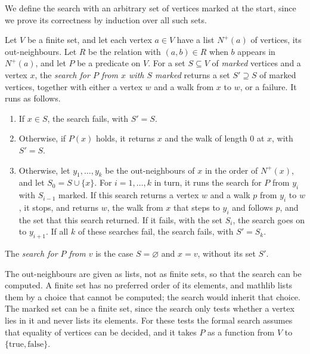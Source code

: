 We define the search with an arbitrary set of vertices marked at the
start, since we prove its correctness by induction over all such sets.

\begin{definition}
  \label{def:reachable-finding}
  \leanok
  Let $V$ be a finite set, and let each vertex $a \in V$ have a list
  $N^+(a)$ of vertices, its out-neighbours. Let $R$ be the relation
  with $(a, b) \in R$ when $b$ appears in $N^+(a)$, and let $P$ be a
  predicate on $V$. For a set $S \subseteq V$ of \emph{marked}
  vertices and a vertex $x$, the \emph{search for $P$ from $x$ with
  $S$ marked} returns a set $S' \supseteq S$ of marked vertices,
  together with either a vertex $w$ and a walk from $x$ to $w$, or a
  failure. It runs as follows.
  \begin{enumerate}
    \item If $x \in S$, the search fails, with $S' = S$.
    \item Otherwise, if $P(x)$ holds, it returns $x$ and the walk of
      length $0$ at $x$, with $S' = S$.
    \item Otherwise, let $y_1, \ldots, y_k$ be the out-neighbours of
      $x$ in the order of $N^+(x)$, and let $S_0 = S \cup \{x\}$. For
      $i = 1, \ldots, k$ in turn, it runs the search for $P$ from
      $y_i$ with $S_{i-1}$ marked. If this search returns a vertex $w$
      and a walk $p$ from $y_i$ to $w$, it stops, and returns $w$, the
      walk from $x$ that steps to $y_i$ and follows $p$, and the set
      that this search returned. If it fails, with the set $S_i$, the
      search goes on to $y_{i+1}$. If all $k$ of these searches fail,
      the search fails, with $S' = S_k$.
  \end{enumerate}
  The \emph{search for $P$ from $v$} is the case $S = \varnothing$ and
  $x = v$, without its set $S'$.
\end{definition}

\begin{fmlnote}
  The out-neighbours are given as lists, not as finite sets, so that
  the search can be computed. A finite set has no preferred order of
  its elements, and mathlib lists them by a choice that cannot be
  computed; the search would inherit that choice. The marked set can
  be a finite set, since the search only tests whether a vertex lies in
  it and never lists its elements. For these tests the formal search
  assumes that equality of vertices can be decided, and it takes $P$ as
  a function from $V$ to $\{\mathrm{true}, \mathrm{false}\}$.
\end{fmlnote}

